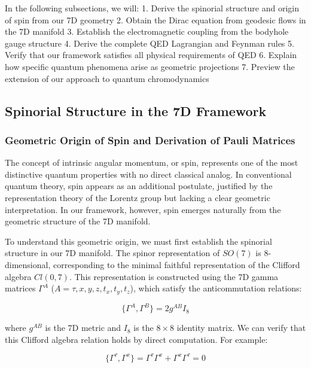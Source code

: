\documentclass{article}
\begin{document}
In the following subsections, we will:
1. Derive the spinorial structure and origin of spin from our 7D geometry
2. Obtain the Dirac equation from geodesic flows in the 7D manifold
3. Establish the electromagnetic coupling from the bodyhole gauge structure
4. Derive the complete QED Lagrangian and Feynman rules
5. Verify that our framework satisfies all physical requirements of QED
6. Explain how specific quantum phenomena arise as geometric projections
7. Preview the extension of our approach to quantum chromodynamics

\subsection{Spinorial Structure in the 7D Framework}

\subsubsection{Geometric Origin of Spin and Derivation of Pauli Matrices}

The concept of intrinsic angular momentum, or spin, represents one of the most distinctive quantum properties with no direct classical analog. In conventional quantum theory, spin appears as an additional postulate, justified by the representation theory of the Lorentz group but lacking a clear geometric interpretation. In our framework, however, spin emerges naturally from the geometric structure of the 7D manifold.

To understand this geometric origin, we must first establish the spinorial structure in our 7D manifold. The spinor representation of $SO(7)$ is 8-dimensional, corresponding to the minimal faithful representation of the Clifford algebra $Cl(0,7)$. This representation is constructed using the 7D gamma matrices $\Gamma^A$ ($A = \tau, x, y, z, t_x, t_y, t_z$), which satisfy the anticommutation relations:

\begin{equation}
\{\Gamma^A, \Gamma^B\} = 2g^{AB}I_8
\end{equation}

where $g^{AB}$ is the 7D metric and $I_8$ is the $8 \times 8$ identity matrix. We can verify that this Clifford algebra relation holds by direct computation. For example:

\begin{equation}
\{\Gamma^\tau, \Gamma^x\} = \Gamma^\tau\Gamma^x + \Gamma^x\Gamma^\tau = 0
\end{equation}
\end{document}
